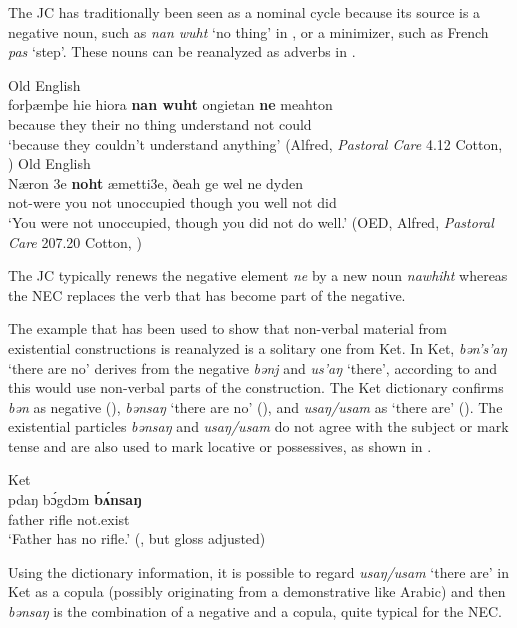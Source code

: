 ﻿\documentclass[output=paper]{langsci/langscibook}
\begin{document}
The JC has traditionally been seen as a nominal cycle because its source is
a negative noun, such as \textit{nan wuht} `no thing' in
, or a minimizer, such as French \textit{pas}
`step'. These nouns can be reanalyzed as adverbs in
. 
%
\begin{exe}\ex Old English \label{ex:other-OE-understand}\\
    \gll forþæmþe hie hiora \textbf{nan wuht} ongietan \textbf{ne} meahton
    \\ 
  because they their {no thing} understand not could \\
    \glt `because they couldn't understand anything'
(Alfred, \textit{Pastoral Care} 4.12 Cotton, \citealt[81]{Gelderen2004})
    \ex Old English \label{ex:other-OE-occupied}\\
    \gll Næron 3e \textbf{noht} æmetti3e, ðeah ge wel ne dyden \\
not-were you not unoccupied though you well not did \\
    \glt `You were not unoccupied, though you did not do well.' 
(OED, Alfred, \textit{Pastoral Care} 207.20 Cotton, \citealt[82]{Gelderen2004})
    \end{exe}
%
The JC typically renews the negative element \textit{ne} by a new noun \textit{nawhiht} whereas the NEC replaces the verb that has become part of the negative.

The example that has been used to show that non-verbal material from
existential constructions is reanalyzed is a solitary one from Ket.
In Ket, \textit{bən's’aŋ} `there are no' derives from the negative
\textit{bənj} and \textit{us'aŋ} `there', according to \textcite[136, but
without a reference]{Veselinova2015} and this would use non-verbal parts
of the construction. The Ket dictionary \parencite{KotorovaNefedov2015}
confirms \textit{bən} as negative (\citeyear[135]{KotorovaNefedov2015}),
\textit{bənsaŋ} `there are no' (\citeyear[136]{KotorovaNefedov2015}), and
\textit{usaŋ\slash usam} as `there are'
(\citeyear[415]{KotorovaNefedov2015}). The existential particles
\textit{bənsaŋ} and \textit{usaŋ\slash usam} do not agree with the subject
or mark tense and are also used to mark locative or possessives, as shown
in .
%
\begin{exe}\ex Ket \label{ex:other-ket-rifle}\\
    pdaŋ   b{\'ɔ}gdɔm    \textbf{b{\'ʌ}nsaŋ} \\
father  rifle    not.exist \\
    \glt `Father has no rifle.' (\citealt[65]{KotorovaNefedov2015}, but gloss adjusted)
    \end{exe}
%
Using the dictionary information, it is possible to regard
\textit{usaŋ\slash usam} `there are' in Ket as a copula (possibly originating
from a demonstrative like Arabic) and then \textit{bənsaŋ} is the
combination of a negative and a copula, quite typical for the NEC.
\end{document}
